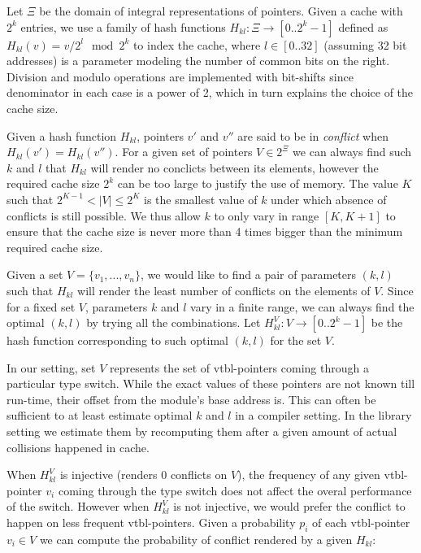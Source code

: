 Let $\Xi$ be the domain of integral representations of pointers. Given a cache 
with $2^k$ entries, we use a family of hash functions $H_{kl} : \Xi \rightarrow [0..2^k-1]$ 
defined as $H_{kl}(v)=v/2^l \mod 2^k$ to index the cache, where $l \in [0..32]$ 
(assuming 32 bit addresses) is a parameter modeling the number of common bits on 
the right. Division and modulo operations are implemented with bit-shifts since 
denominator in each case is a power of 2, which in turn explains the choice of 
the cache size.

Given a hash function $H_{kl}$, pointers $v'$ and $v''$ are said to be in 
\emph{conflict} when $H_{kl}(v')=H_{kl}(v'')$. For a given set of pointers 
$V \in 2^{\Xi}$ we can always find such $k$ and $l$ that $H_{kl}$ will render no  
conclicts between its elements, however the required cache size $2^k$ can be too 
large to justify the use of memory. The value $K$ such that $2^{K-1} < |V| \leq 2^K$ 
is the smallest value of $k$ under which absence of conflicts is still possible. 
We thus allow $k$ to only vary in range $[K,K+1]$ to ensure that the cache size 
is never more than 4 times bigger than the minimum required cache size.

Given a set $V = \{v_1, ... , v_n\}$, we would like to find a pair of parameters 
$(k,l)$ such that $H_{kl}$ will render the least number of conflicts on the 
elements of $V$. Since for a fixed set $V$, parameters $k$ and $l$ vary in a 
finite range, we can always find the optimal $(k,l)$ by trying all the
combinations. Let $H_{kl}^V : V \rightarrow [0..2^k-1]$ be the hash function 
corresponding to such optimal $(k,l)$ for the set $V$. 

In our setting, set $V$ represents the set of vtbl-pointers coming through a 
particular type switch. While the exact values of these pointers are not known 
till run-time, their offset from the module's base address is. This can often be 
sufficient to at least estimate optimal $k$ and $l$ in a compiler setting. In 
the library setting we estimate them by recomputing them after a given amount of 
actual collisions happened in cache.

When $H_{kl}^V$ is injective (renders 0 conflicts on $V$), the frequency of any 
given vtbl-pointer $v_i$ coming through the type switch does not affect the 
overal performance of the switch. However when $H_{kl}^V$ is not injective, we 
would prefer the conflict to happen on less frequent vtbl-pointers.
Given a probability $p_i$ of each vtbl-pointer $v_i \in V$ we can compute the 
probability of conflict rendered by a given $H_{kl}$:

